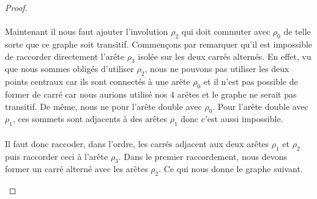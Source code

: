 \begin{proof}
\begin{figure}[H]
\begin{center}
\begin{tikzpicture}
      \end{tikzpicture}
      \caption{}
    \end{center}
  \end{figure}

  \paragraph{}
  Maintenant il nous faut ajouter l'involution $\rho_2$ qui doit commuter avec $\rho_0$ de telle sorte que ce graphe soit transitif. Commençons par remarquer qu'il est impossible de raccorder directement l'arête $\rho_3$ isolée sur les deux carrés alternés. En effet, vu que nous sommes obligés d'utiliser $\rho_2$, nous ne pouvons pas utiliser les deux points centraux car ils sont connectés à une arête $\rho_0$ et il n'est pas possible de former de carré car nous aurions utilisé nos 4 arêtes et le graphe ne serait pas transitif. De même, nous ne pour l'arête double avec $\rho_0$. Pour l'arête double avec $\rho_1$, ces sommets sont adjacents à des arêtes $\rho_1$ donc c'est aussi impossible.

  \paragraph{}
  Il faut donc raccoder, dans l'ordre, les carrés adjacent aux deux arêtes $\rho_1$ et $\rho_2$ puis raccorder ceci à l'arête $\rho_3$. Dans le premier raccordement, nous devons former un carré alterné avec les arêtes $\rho_2$. Ce qui nous donne le graphe suivant.

  \begin{figure}[H]
    \begin{center}
\end{center}
\end{figure}
\end{proof}
